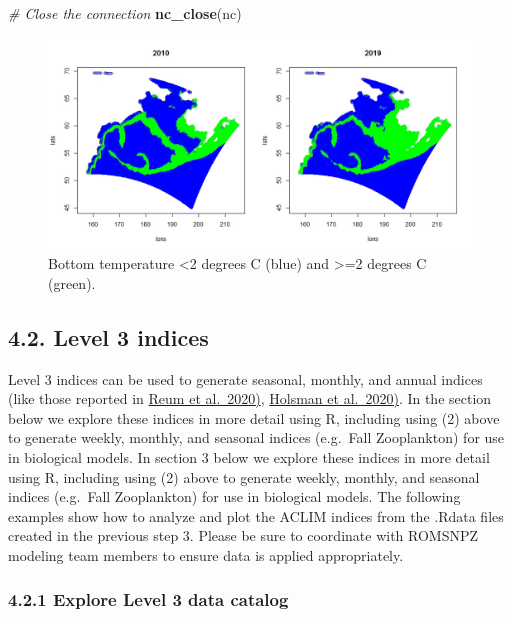 \documentclass[
]{article}
\newenvironment{Shaded}{\begin{snugshade}}{\end{snugshade}}
\newcommand{\CommentTok}[1]{\textcolor[rgb]{0.56,0.35,0.01}{\textit{#1}}}
\newcommand{\KeywordTok}[1]{\textcolor[rgb]{0.13,0.29,0.53}{\textbf{#1}}}
\newcommand{\NormalTok}[1]{#1}
\begin{document}
\begin{Shaded}
\begin{Highlighting}[]
   \CommentTok{# Close the connection}
   \KeywordTok{nc_close}\NormalTok{(nc)}
\end{Highlighting}
\end{Shaded}

\begin{figure}
\centering
\includegraphics[width=1\textwidth,height=\textheight]{Figs/minimal_coldpool.jpg}
\caption{Bottom temperature \textless2 degrees C (blue) and
\textgreater=2 degrees C (green).}
\end{figure}

\hypertarget{level-3-indices}{%
\subsection{4.2. Level 3 indices}\label{level-3-indices}}

Level 3 indices can be used to generate seasonal, monthly, and annual
indices (like those reported in
\href{https://www.frontiersin.org/articles/10.3389/fmars.2020.00124/full}{Reum
et al.~2020)},
\href{http://dx.doi.org/10.1038/s41467-020-18300-3}{Holsman et
al.~2020)}. In the section below we explore these indices in more detail
using R, including using (2) above to generate weekly, monthly, and
seasonal indices (e.g.~Fall Zooplankton) for use in biological models.
In section 3 below we explore these indices in more detail using R,
including using (2) above to generate weekly, monthly, and seasonal
indices (e.g.~Fall Zooplankton) for use in biological models. The
following examples show how to analyze and plot the ACLIM indices from
the .Rdata files created in the previous step 3. Please be sure to
coordinate with ROMSNPZ modeling team members to ensure data is applied
appropriately.

\hypertarget{explore-level-3-data-catalog}{%
\subsubsection{4.2.1 Explore Level 3 data
catalog}\label{explore-level-3-data-catalog}}
\end{document}
